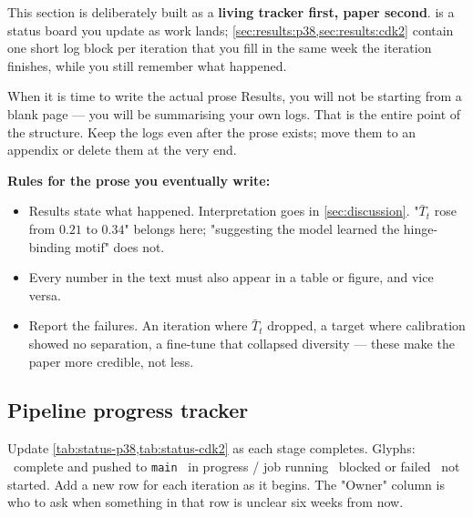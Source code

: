 \documentclass[11pt]{article}
\newcommand{\done}{\textcolor{green!55!black}{\ding{51}}}
\newcommand{\wip}{\textcolor{orange!90!black}{\ding{110}}}
\newcommand{\blocked}{\textcolor{red!80!black}{\ding{55}}}
\newcommand{\notstarted}{\textcolor{gray!70}{\ding{109}}}
\newcommand{\Tbar}{\bar{T}}
\begin{document}
\begin{guide}
This section is deliberately built as a \textbf{living tracker first, paper
second}.  is a status board you update as work lands;
\cref{sec:results:p38,sec:results:cdk2} contain one short log block per
iteration that you fill in the same week the iteration finishes, while you still
remember what happened.

\smallskip
When it is time to write the actual prose Results, you will not be starting from
a blank page --- you will be summarising your own logs. That is the entire point
of the structure. Keep the logs even after the prose exists; move them to an
appendix or delete them at the very end.

\smallskip
\textbf{Rules for the prose you eventually write:}
\begin{itemize}\itemsep0pt
  \item Results state what happened. Interpretation goes in
        \cref{sec:discussion}. "$\Tbar_t$ rose from $0.21$ to $0.34$" belongs
        here; "suggesting the model learned the hinge-binding motif" does not.
  \item Every number in the text must also appear in a table or figure, and
        vice versa.
  \item Report the failures. An iteration where $\Tbar_t$ dropped, a target
        where calibration showed no separation, a fine-tune that collapsed
        diversity --- these make the paper more credible, not less.
\end{itemize}
\end{guide}

\subsection{Pipeline progress tracker}
\label{sec:results:tracker}

\begin{guide}
Update \cref{tab:status-p38,tab:status-cdk2} as each stage completes.
Glyphs: \done\ complete and pushed to \texttt{main}\quad
\wip\ in progress / job running\quad
\blocked\ blocked or failed\quad
\notstarted\ not started.
Add a new row for each iteration as it begins. The "Owner" column is who to ask
when something in that row is unclear six weeks from now.
\end{guide}
\end{document}
